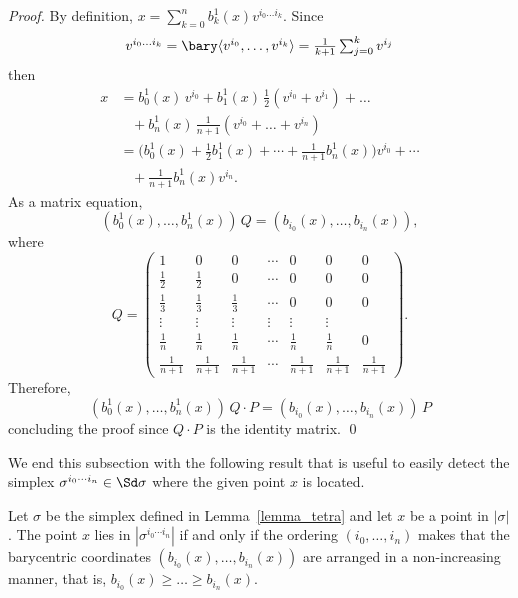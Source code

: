 \begin{proof}
By definition, $ x = \sum_{k=0}^n b^1_k(x) v^{i_0\dots i_k}$. 
Since 
$$\mbox{$v^{i_0\dots i_k}=\bary \langle v^{i_0},\dots,v^{i_k}\rangle = \frac{1}{k+1} \sum_{j=0}^k v^{i_j}$}$$ then
\begin{equation*}
\begin{split}
x &\mbox{$= b^1_0(x)\,v^{i_0}
+b^1_1(x)\,\frac{1}{2}(v^{i_0} + v^{i_1} )
+\dots$}
\\
&\mbox{$\;\;\;+ b^1_n(x)\,\frac{1}{n+1}(v^{i_0} + \dots + v^{i_n})$}\\
&\mbox{$=\big(b^1_0(x)+\frac{1}{2}b^1_1(x)+\cdots+\frac{1}{n+1}b^1_n(x)\big)v^{i_0}+\cdots$}\\
&\mbox{$\;\;\;+\frac{1}{n+1}
 b^1_n(x) v^{i_n}$.}   
\end{split}    
\end{equation*}
As a matrix equation, $$(b^1_0(x),\dots, b^1_n(x))\, Q = (b_{i_0}(x),\dots ,b_{i_n}(x)),$$ where
$$
Q =
\begin{pmatrix}
 1  &  0 &  0 & \cdots  & 0 & 0 & 0   \\
 \frac{1}{2} & \frac{1}{2} &  0 & \cdots  & 0 & 0 & 0   \\
 \frac{1}{3}  & \frac{1}{3} & \frac{1}{3} & \cdots  & 0 & 0 & 0   \\
\vdots & \vdots   & \vdots & \vdots         &\vdots          & \vdots \\
 \frac{1}{n}  &  \frac{1}{n} & \frac{1}{n}  & \cdots  &  \frac{1}{n}             &  \frac{1}{n}        & 0  \\
 \frac{1}{n+1} & \frac{1}{n+1}  & \frac{1}{n+1}  & \cdots   & \frac{1}{n+1} &   \frac{1}{n+1} & \frac{1}{n+1}
\end{pmatrix}.$$
Therefore, $$(b^1_0(x),\dots, b^1_n(x))\, Q\cdot P= (b_{i_0}(x),\dots ,b_{i_n}(x))\,P$$ concluding the proof  since $Q\cdot P$ is the identity matrix.
\qed
\end{proof}

We end this subsection with the following result that is useful to easily detect the simplex  $\sigma^{i_0\cdots i_n}\in \Sd \sigma$
where the given point $x$ is located.

\begin{lemma}
Let $\sigma$ be the simplex defined in Lemma~\ref{lemma_tetra} and let $x$ be a point in $|\sigma|$. The point $x$ lies in $|\sigma^{i_0\cdots i_n}|$ if and only if the ordering $(i_0,\dots,i_n)$ makes that the barycentric coordinates $(b_{i_0}(x),\dots,b_{i_n}(x))$
are arranged in a non-increasing manner, that is,  $b_{i_0}(x)\geq \dots \geq b_{i_n}(x)$. 
\end{lemma}

